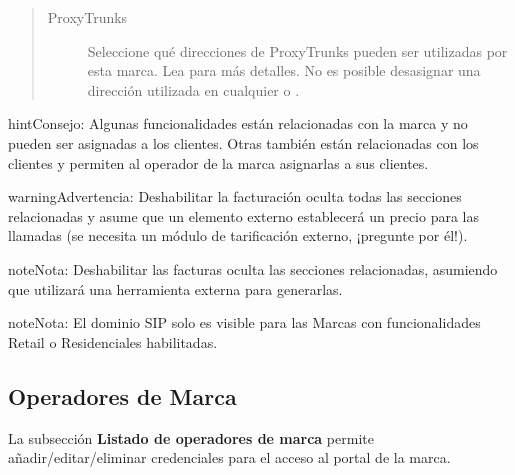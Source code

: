 \documentclass[letterpaper,10pt,spanish]{sphinxmanual}
\begin{document}
\begin{quote}
\begin{description}
\item[{ProxyTrunks}] \leavevmode
Seleccione qué direcciones de ProxyTrunks pueden ser utilizadas por esta marca. Lea {\hyperref[administration_portal/platform/infrastructure/proxy_trunks:proxy\string-trunks]{}} para más detalles. No es posible desasignar una dirección utilizada en cualquier {\hyperref[administration_portal/brand/providers/carriers:carriers]{}} o {\hyperref[administration_portal/brand/providers/ddi_providers:ddi\string-providers]{}}.

\end{description}
\end{quote}

\begin{notice}{hint}{Consejo:}
Algunas funcionalidades están relacionadas con la marca y no pueden ser asignadas a los clientes. Otras también están relacionadas con los clientes y permiten al operador de la marca asignarlas a sus clientes.
\end{notice}

\begin{notice}{warning}{Advertencia:}
Deshabilitar la facturación oculta todas las secciones relacionadas y asume que un elemento externo establecerá un precio para las llamadas (se necesita un módulo de tarificación externo, ¡pregunte por él!).
\end{notice}

\begin{notice}{note}{Nota:}
Deshabilitar las facturas oculta las secciones relacionadas, asumiendo que utilizará una herramienta externa para generarlas.
\end{notice}

\begin{notice}{note}{Nota:}
El dominio SIP solo es visible para las Marcas con funcionalidades Retail o Residenciales habilitadas.
\end{notice}


\subsection{Operadores de Marca}
\label{administration_portal/platform/brands:id2}\label{administration_portal/platform/brands:brand-operators}
La subsección \textbf{Listado de operadores de marca} permite añadir/editar/eliminar credenciales para el acceso al portal de la marca.
\end{document}
